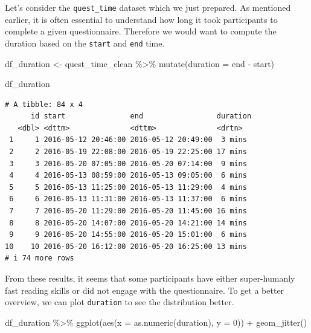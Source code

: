 \documentclass[
  letterpaper,
]{krantz}
\makeatletter
\newenvironment{Shaded}{\begin{snugshade}}{\end{snugshade}}
\newcommand{\AttributeTok}[1]{\textcolor[rgb]{0.40,0.45,0.13}{#1}}
\newcommand{\DecValTok}[1]{\textcolor[rgb]{0.68,0.00,0.00}{#1}}
\newcommand{\FunctionTok}[1]{\textcolor[rgb]{0.28,0.35,0.67}{#1}}
\newcommand{\NormalTok}[1]{\textcolor[rgb]{0.00,0.23,0.31}{#1}}
\newcommand{\OtherTok}[1]{\textcolor[rgb]{0.00,0.23,0.31}{#1}}
\newcommand{\SpecialCharTok}[1]{\textcolor[rgb]{0.37,0.37,0.37}{#1}}
\newenvironment{kframe}{%
\medskip{}
\setlength{\fboxsep}{.8em}
 \def\at@end@of@kframe{}%
 \ifinner\ifhmode%
  \def\at@end@of@kframe{\end{minipage}}%
  \begin{minipage}{\columnwidth}%
 \fi\fi%
 \def\FrameCommand##1{\hskip\@totalleftmargin \hskip-\fboxsep
 \colorbox{shadecolor}{##1}\hskip-\fboxsep
     \hskip-\linewidth \hskip-\@totalleftmargin \hskip\columnwidth}%
 \MakeFramed {\advance\hsize-\width
   \@totalleftmargin\z@ \linewidth\hsize
   \@setminipage}}%
 {\par\unskip\endMakeFramed%
 \at@end@of@kframe}
\renewenvironment{Shaded}{\begin{kframe}}{\end{kframe}}
\makeatother
\begin{document}
Let's consider the \texttt{quest\_time} dataset which we just prepared.
As mentioned earlier, it is often essential to understand how long it
took participants to complete a given questionnaire. Therefore we would
want to compute the duration based on the \texttt{start} and
\texttt{end} time.

\begin{Shaded}
\begin{Highlighting}[]
\NormalTok{df\_duration }\OtherTok{\textless{}{-}}
\NormalTok{  quest\_time\_clean }\SpecialCharTok{\%\textgreater{}\%}
  \FunctionTok{mutate}\NormalTok{(}\AttributeTok{duration =}\NormalTok{ end }\SpecialCharTok{{-}}\NormalTok{ start)}

\NormalTok{df\_duration}
\end{Highlighting}
\end{Shaded}

\begin{verbatim}
# A tibble: 84 x 4
      id start               end                 duration
   <dbl> <dttm>              <dttm>              <drtn>  
 1     1 2016-05-12 20:46:00 2016-05-12 20:49:00  3 mins 
 2     2 2016-05-19 22:08:00 2016-05-19 22:25:00 17 mins 
 3     3 2016-05-20 07:05:00 2016-05-20 07:14:00  9 mins 
 4     4 2016-05-13 08:59:00 2016-05-13 09:05:00  6 mins 
 5     5 2016-05-13 11:25:00 2016-05-13 11:29:00  4 mins 
 6     6 2016-05-13 11:31:00 2016-05-13 11:37:00  6 mins 
 7     7 2016-05-20 11:29:00 2016-05-20 11:45:00 16 mins 
 8     8 2016-05-20 14:07:00 2016-05-20 14:21:00 14 mins 
 9     9 2016-05-20 14:55:00 2016-05-20 15:01:00  6 mins 
10    10 2016-05-20 16:12:00 2016-05-20 16:25:00 13 mins 
# i 74 more rows
\end{verbatim}

From these results, it seems that some participants have either
super-humanly fast reading skills or did not engage with the
questionnaire. To get a better overview, we can plot \texttt{duration}
to see the distribution better.

\begin{Shaded}
\begin{Highlighting}[]
\NormalTok{df\_duration }\SpecialCharTok{\%\textgreater{}\%}
  \FunctionTok{ggplot}\NormalTok{(}\FunctionTok{aes}\NormalTok{(}\AttributeTok{x =} \FunctionTok{as.numeric}\NormalTok{(duration),}
             \AttributeTok{y =} \DecValTok{0}\NormalTok{)) }\SpecialCharTok{+}
  \FunctionTok{geom\_jitter}\NormalTok{()}
\end{Highlighting}
\end{Shaded}
\end{document}

